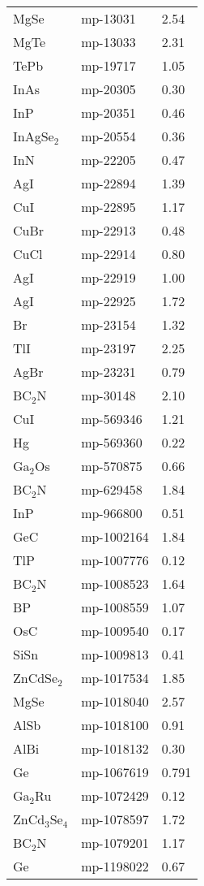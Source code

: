 \begin{center}
\begin{longtable}{M{3.5cm} M{6.5cm} M{2.0cm}}
  MgSe & mp-13031 & 2.54\\
  MgTe & mp-13033 & 2.31\\
  TePb & mp-19717 & 1.05\\
  InAs & mp-20305 & 0.30\\
  InP & mp-20351 & 0.46\\
  InAgSe$_2$ & mp-20554 & 0.36\\
  InN & mp-22205 & 0.47\\
  AgI & mp-22894 & 1.39\\
  CuI & mp-22895 & 1.17\\
  CuBr & mp-22913 & 0.48\\
  CuCl & mp-22914 & 0.80\\
  AgI & mp-22919 & 1.00\\
  AgI & mp-22925 & 1.72\\
  Br & mp-23154 & 1.32\\
  TlI & mp-23197 & 2.25\\
  AgBr & mp-23231 & 0.79\\
  BC$_2$N & mp-30148 & 2.10\\
  CuI & mp-569346 & 1.21\\
  Hg & mp-569360 & 0.22\\
  Ga$_2$Os & mp-570875 & 0.66\\
  BC$_2$N & mp-629458 & 1.84\\
  InP & mp-966800 & 0.51\\
  GeC & mp-1002164 & 1.84\\
  TlP & mp-1007776 & 0.12\\
  BC$_2$N & mp-1008523 & 1.64\\
  BP & mp-1008559 & 1.07\\
  OsC & mp-1009540 & 0.17\\
  SiSn & mp-1009813 & 0.41\\
  ZnCdSe$_2$ & mp-1017534 & 1.85\\
  MgSe & mp-1018040 & 2.57\\
  AlSb & mp-1018100 & 0.91\\
  AlBi & mp-1018132 & 0.30\\
  Ge & mp-1067619 & 0.791\\
  Ga$_2$Ru & mp-1072429 & 0.12\\
  ZnCd$_3$Se$_4$ & mp-1078597 & 1.72\\
  BC$_2$N & mp-1079201 & 1.17\\
  Ge & mp-1198022 & 0.67\\
  \hline
\end{longtable}
\end{center}
